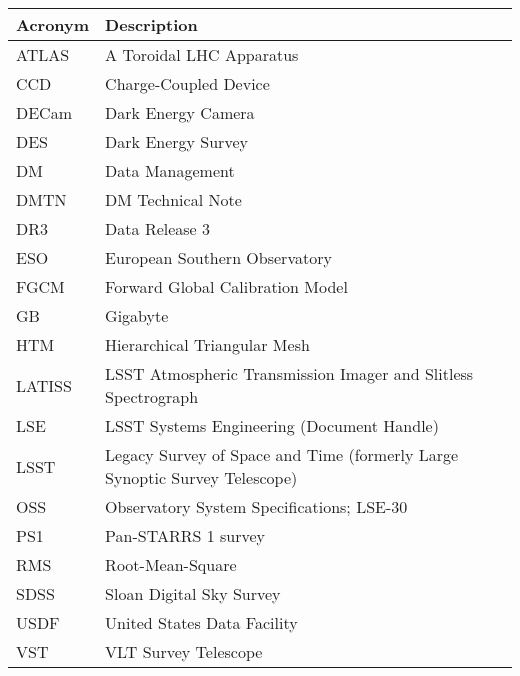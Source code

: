 \addtocounter{table}{-1}
\begin{longtable}{p{}p{}}\hline
\textbf{Acronym} & \textbf{Description}  \\\hline

ATLAS & A Toroidal LHC Apparatus \\\hline
CCD & Charge-Coupled Device \\\hline
DECam & Dark Energy Camera \\\hline
DES & Dark Energy Survey \\\hline
DM & Data Management \\\hline
DMTN & DM Technical Note \\\hline
DR3 & Data Release 3 \\\hline
ESO & European Southern Observatory \\\hline
FGCM & Forward Global Calibration Model \\\hline
GB & Gigabyte \\\hline
HTM & Hierarchical Triangular Mesh \\\hline
LATISS & LSST Atmospheric Transmission Imager and Slitless Spectrograph \\\hline
LSE & LSST Systems Engineering (Document Handle) \\\hline
LSST & Legacy Survey of Space and Time (formerly Large Synoptic Survey Telescope) \\\hline
OSS & Observatory System Specifications; LSE-30 \\\hline
PS1 & Pan-STARRS 1 survey \\\hline
RMS & Root-Mean-Square \\\hline
SDSS & Sloan Digital Sky Survey \\\hline
USDF & United States Data Facility \\\hline
VST & VLT Survey Telescope \\\hline
\end{longtable}
